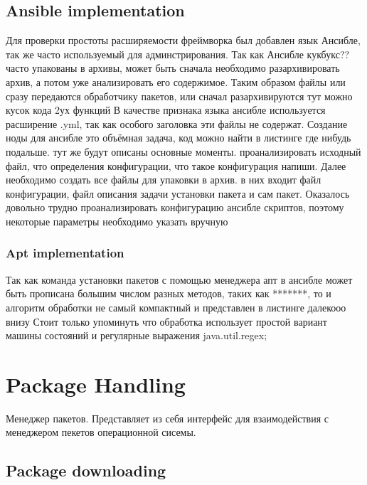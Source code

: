 {\subsection*{Ansible implementation}
Для проверки простоты расширяемости фреймворка был добавлен язык Ансибле, так же часто используемый для админстрирования.
Так как Ансибле кукбукс?? часто упакованы в архивы, может быть сначала необходимо разархивировать архив, а потом уже анализировать  его содержимое. Таким образом файлы или сразу передаются обработчику пакетов, или сначал разархивируются 
тут можно кусок кода 2ух функций
В качестве признака языка ансибле используется расширение .yml, так как особого заголовка эти файлы не содержат.
Создание ноды для ансибле это объёмная задача, код можно найти в листинге где нибудь подальше. тут же будут описаны основные моменты.
проанализировать исходный файл, что определения конфигурации, что такое конфигурация напиши.
Далее необходимо создать все файлы для упаковки в архив. в них входит файл конфигурации, файл описания задачи установки пакета и сам пакет.
Оказалось довольно трудно проанализировать конфигурацию ансибле скриптов, поэтому некоторые параметры необходимо указать вручную
\fi
\subsubsection*{Apt implementation}
Так как команда установки пакетов с помощью менеджера апт в ансибле может быть прописана большим числом разных методов, таких как *******, то и алгоритм обработки не самый компактный и представлен в листинге далекооо внизу
Стоит только упоминуть что обработка использует простой вариант машины состояний и регулярные выражения java.util.regex;

\fi
\section{Package Handling}
Менеджер пакетов. Представляет из себя интерфейс для взаимодействия с менеджером пекетов операционной сисемы. 
\fi
\subsection*{Package downloading}

}
